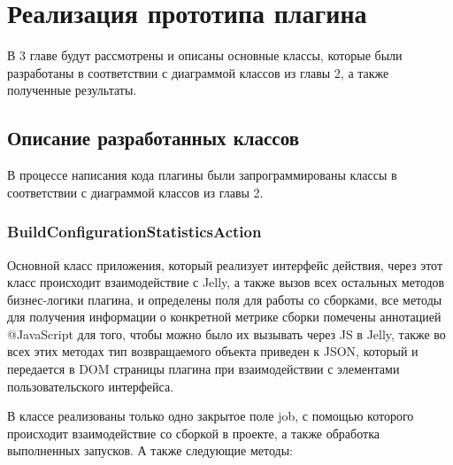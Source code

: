 \chapter{Реализация прототипа плагина} \label{ch3}

В 3 главе будут рассмотрены и описаны основные классы, которые были разработаны в соответствии с диаграммой классов из главы 2, а также полученные результаты.

\section{Описание разработанных классов} \label{ch3:sec1}

В процессе написания кода плагины были запрограммированы классы в соответствии с диаграммой классов из главы 2.

\subsection{BuildConfigurationStatisticsAction}

Основной класс приложения, который реализует интерфейс действия, через этот класс происходит взаимодействие с Jelly, а также вызов всех остальных методов бизнес-логики плагина, и определены поля для работы со сборками, все методы для получения информации о конкретной метрике сборки помечены аннотацией @JavaScript для того, чтобы можно было их вызывать через JS в Jelly, также во всех этих методах тип возвращаемого объекта приведен к JSON, который и передается в DOM страницы плагина при взаимодействии с элементами пользовательского интерфейса.

В классе реализованы только одно закрытое поле job, с помощью которого происходит взаимодействие со сборкой в проекте, а также обработка выполненных запусков. А также следующие методы:

